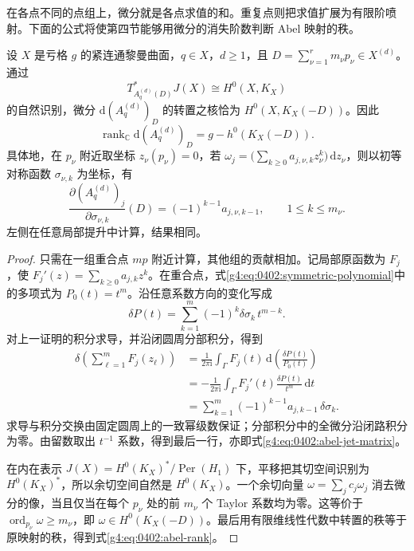 在各点不同的点组上，微分就是各点求值的和。重复点则把求值扩展为有限阶喷射。下面的公式将使第四节能够用微分的消失阶数判断 Abel 映射的秩。

\begin{proposition}
	\label{g4:prop:0402:abel-differential}
	设 \(X\) 是亏格 \(g\) 的紧连通黎曼曲面，\(q\in X\)，\(d\ge1\)，且 \(D=\sum_{\nu=1}^r m_\nu p_\nu\in X^{(d)}\)。通过
	\[
		T_{A_q^{(d)}(D)}^*J(X)\cong H^0(X,K_X)
	\]
	的自然识别，微分 \(\mathrm{d}(A_q^{(d)})_D\) 的转置之核恰为 \(H^0(X,K_X(-D))\)。因此
	\begin{equation}\label{g4:eq:0402:abel-rank}
		\operatorname{rank}_{\mathbb C}\mathrm{d}(A_q^{(d)})_D
		=g-h^0(K_X(-D)).
	\end{equation}
	具体地，在 \(p_\nu\) 附近取坐标 \(z_\nu(p_\nu)=0\)，若
	\(\omega_j=\bigl(\sum_{k\ge0}a_{j,\nu,k}z_\nu^k\bigr)\,\mathrm{d}z_\nu\)，则以初等对称函数 \(\sigma_{\nu,k}\) 为坐标，有
	\begin{equation}\label{g4:eq:0402:abel-jet-matrix}
		\frac{\partial(A_q^{(d)})_j}{\partial\sigma_{\nu,k}}(D)
		=(-1)^{k-1}a_{j,\nu,k-1},
		\qquad 1\le k\le m_\nu.
	\end{equation}
	左侧在任意局部提升中计算，结果相同。
\end{proposition}
\begin{proof}
	只需在一组重合点 \(mp\) 附近计算，其他组的贡献相加。记局部原函数为 \(F_j\)，使 \(F_j'(z)=\sum_{k\ge0}a_{j,k}z^k\)。在重合点，式\eqref{g4:eq:0402:symmetric-polynomial}中的多项式为 \(P_0(t)=t^m\)。沿任意系数方向的变化写成
	\[
		\delta P(t)=\sum_{k=1}^m(-1)^k\delta\sigma_k\,t^{m-k}.
	\]
	对上一证明的积分求导，并沿闭圆周分部积分，得到
	\[
		\begin{aligned}
		\delta\left(\sum_{\ell=1}^mF_j(z_\ell)\right)
		&=\frac{1}{2\pi\mathrm{i}}\int_\Gamma
		F_j(t)\,\mathrm{d}\left(\frac{\delta P(t)}{P_0(t)}\right)\\
		&=-\frac{1}{2\pi\mathrm{i}}\int_\Gamma
		F_j'(t)\frac{\delta P(t)}{t^m}\,\mathrm{d}t\\
		&=\sum_{k=1}^m(-1)^{k-1}a_{j,k-1}\,\delta\sigma_k.
		\end{aligned}
	\]
	求导与积分交换由固定圆周上的一致幂级数保证；分部积分中的全微分沿闭路积分为零。由留数取出 \(t^{-1}\) 系数，得到最后一行，亦即式\eqref{g4:eq:0402:abel-jet-matrix}。

	在内在表示 \(J(X)=H^0(K_X)^*/\operatorname{Per}(H_1)\) 下，平移把其切空间识别为 \(H^0(K_X)^*\)，所以余切空间自然是 \(H^0(K_X)\)。一个余切向量 \(\omega=\sum_jc_j\omega_j\) 消去微分的像，当且仅当在每个 \(p_\nu\) 处的前 \(m_\nu\) 个 Taylor 系数均为零。这等价于 \(\operatorname{ord}_{p_\nu}\omega\ge m_\nu\)，即 \(\omega\in H^0(K_X(-D))\)。最后用有限维线性代数中转置的秩等于原映射的秩，得到式\eqref{g4:eq:0402:abel-rank}。
\end{proof}

